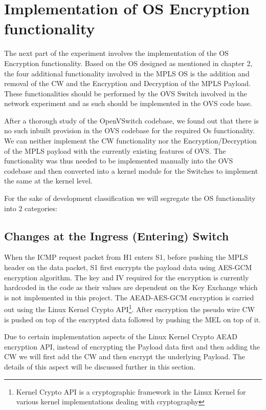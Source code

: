 \section{Implementation of OS Encryption functionality}
The next part of the experiment involves the implementation of the OS Encryption functionality. Based on the OS designed as mentioned in chapter 2, the four additional functionality involved in the MPLS OS is the addition and removal of the CW and the Encryption and Decryption of the MPLS Payload. These functionalities should be performed by the OVS Switch involved in the network experiment and as such should be implemented in the OVS code base. 

After a thorough study of the OpenVSwitch codebase, we found out that there is no such inbuilt provision in the OVS codebase for the required Os functionality. We can neither implement the CW functionality nor the Encryption/Decryption of the MPLS payload with the currently existing features of OVS. The functionality was thus needed to be implemented manually into the OVS codebase and then converted into a kernel module for the Switches to implement the same at the kernel level.

For the sake of development classification we will segregate the OS functionality into 2 categories:

\subsection{Changes at the Ingress (Entering) Switch}
When the ICMP request packet from H1 enters S1, before pushing the MPLS header on the data packet, S1 first encrypts the payload data using AES-GCM encryption algorithm. The key and IV required for the encryption is currently hardcoded in the code as their values are dependent on the Key Exchange which is not implemented in this project. The AEAD-AES-GCM encryption is carried out using the Linux Kernel Crypto API\footnote{Kernel Crypto API is a cryptographic framework in the Linux Kernel for various kernel implementations dealing with cryptography}. After encryption the pseudo wire CW is pushed on top of the encrypted data followed by pushing the MEL on top of it.

Due to certain implementation aspects of the Linux Kernel Crypto AEAD encryption API, instead of encrypting the Payload data first and then adding the CW we will first add the CW and then encrypt the underlying Payload. The details of this aspect will be discussed further in this section.

